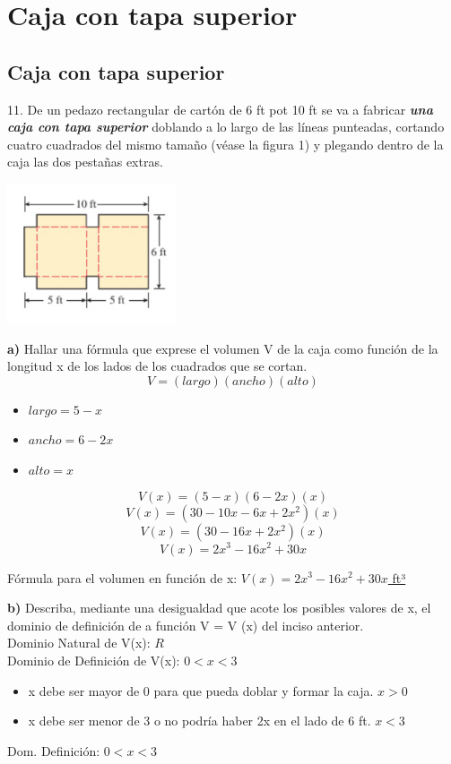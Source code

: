 \chapter*{Caja con tapa superior}
\section*{Caja con tapa superior}

11. De un pedazo rectangular de cartón de 6 ft pot 10 ft se va a fabricar \textbf{\textit{una caja con tapa superior}} doblando a lo largo de las líneas punteadas, cortando cuatro cuadrados del mismo tamaño (véase la figura 1) y plegando dentro de la caja las dos pestañas extras.
\newline
\begin{center}
     \includegraphics[width=5cm]{recursos/Caja_doc_tarea.png}\par
\end{center}

\textbf{a)} Hallar una fórmula que exprese el volumen V de la caja como función de la longitud x de los lados de los cuadrados que se cortan.\\
\[
V = (largo)(ancho)(alto)
\]
\begin{itemize}
        \item $largo = 5 -x$
        \item $ancho = 6 -2x$
        \item $alto = x$
    \end{itemize}
\[
V(x) = (5-x)(6-2x)(x)
\]
\[
V(x) = (30-10x-6x+2x^{2})(x)
\]
\[
V(x) = (30-16x+2x^{2})(x)
\]
\[
V(x) = 2x^{3}-16x^{2}+30x 
\]
\begin{center}
    Fórmula para el volumen en función de x: \underline{ $V(x) = 2x^{3}-16x^{2}+30x $ ft³} 
\end{center} 

\textbf{b)} Describa, mediante una desigualdad que acote los posibles valores de x, el dominio de definición de a función V = V (x) del inciso anterior. \\
\newline
Dominio Natural de V(x): $R$ \\
Dominio de Definición de V(x): $0 < x < 3$
\begin{itemize}
    \item x debe ser mayor de 0 para que pueda doblar y formar la caja. $x > 0$
    \item x debe ser menor de 3 o no podría haber 2x en el lado de 6 ft. $x < 3$
\end{itemize}
\begin{center}
    Dom. Definición: \underline{$0 < x < 3$}
\end{center}



